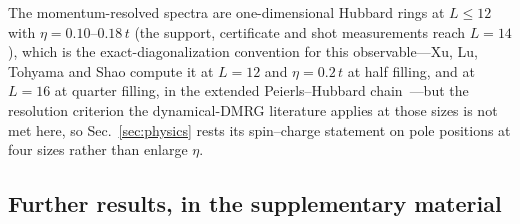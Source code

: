The momentum-resolved spectra are one-dimensional Hubbard rings at $L\le12$ with $\eta=0.10$--$0.18\,t$ (the support, certificate and shot measurements reach $L=14$), which is the
exact-diagonalization convention for this observable---Xu, Lu, Tohyama and Shao compute it at $L=12$
and $\eta=0.2\,t$ at half filling, and at $L=16$ at quarter filling, in the extended
Peierls--Hubbard chain~\cite{xu2024}---but the resolution criterion the dynamical-DMRG literature
applies at those sizes is not met here, so Sec.~\ref{sec:physics} rests its spin--charge statement on
pole positions at four sizes rather than enlarge $\eta$.

\subsection{Further results, in the supplementary material}
\label{sec:scope:further}

